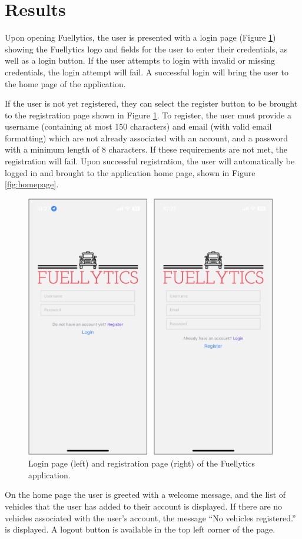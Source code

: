 \documentclass[11pt, oneside]{article}
\begin{document}
\section{Results}
Upon opening Fuellytics, the user is presented with a login page (Figure \ref*{fig:login-register}) showing the Fuellytics logo and fields for the user to enter their credentials, as well as a login button. If the user attempts to login with invalid or missing credentials, the login attempt will fail.  A successful login will bring the user to the home page of the application.

If the user is not yet registered, they can select the register button to be brought to the registration page shown in Figure \ref*{fig:login-register}.  To register, the user must provide a username (containing at most 150 characters) and email (with valid email formatting) which are not already associated with an account, and a password with a minimum length of 8 characters.  If these requirements are not met, the registration will fail. Upon successful registration, the user will automatically be logged in and brought to the application home page, shown in Figure \ref*{fig:homepage}.
\begin{figure}[H]
\centerline{\includegraphics[width=11cm]{img/login-register.png}}
\caption{\label{fig:login-register} Login page (left) and registration page (right) of the Fuellytics application.}
\end{figure}

On the home page the user is greeted with a welcome message, and the list of vehicles that the user has added to their account is displayed.  If there are no vehicles associated with the user's account, the message ``No vehicles registered.'' is displayed.  A logout button is available in the top left corner of the page.
\end{document}

